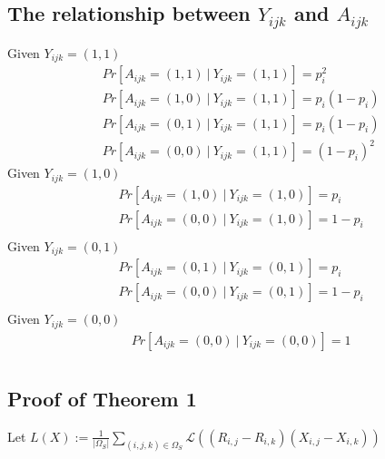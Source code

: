 \documentclass[conference]{IEEEtran}
\numberwithin{equation}{section}
\newtheorem{sampling strategy}{Sampling Strategy}
\begin{document}
\subsection{The relationship between $Y_{ijk}$ and $A_{ijk}$}
Given $Y_{ijk} = (1,1)$
\begin{equation}
\begin{aligned}
    & Pr[A_{ijk} = (1,1) ~|~ Y_{ijk} = (1,1)] = p_i^2 \\ 
    & Pr[A_{ijk} = (1,0) ~|~ Y_{ijk} = (1,1)] = p_i(1-p_i) \\
    & Pr[A_{ijk} = (0,1) ~|~ Y_{ijk} = (1,1)] = p_i(1-p_i) \\
    & Pr[A_{ijk} = (0,0) ~|~ Y_{ijk} = (1,1)] = (1-p_i)^2 \nonumber
\end{aligned}
\end{equation}
Given $Y_{ijk} = (1,0)$
\begin{equation}
\begin{aligned}
    & Pr[A_{ijk} = (1,0) ~|~ Y_{ijk} = (1,0)] = p_i \\ 
    & Pr[A_{ijk} = (0,0) ~|~ Y_{ijk} = (1,0)] = 1-p_i \\
 \nonumber
\end{aligned}
\end{equation}
Given $Y_{ijk} = (0,1)$
\begin{equation}
\begin{aligned}
    & Pr[A_{ijk} = (0,1) ~|~ Y_{ijk} = (0,1)] = p_i \\ 
    & Pr[A_{ijk} = (0,0) ~|~ Y_{ijk} = (0,1)] = 1-p_i \\
 \nonumber
\end{aligned}
\end{equation}
Given $Y_{ijk} = (0,0)$
\begin{equation}
\begin{aligned}
    & Pr[A_{ijk} = (0,0) ~|~ Y_{ijk} = (0,0)] = 1 \\ 
 \nonumber
\end{aligned}
\end{equation}

\subsection{Proof of Theorem 1}


Let $\displaystyle L(X) := \frac{1}{|\Omega_S|} \sum_{(i,j,k) \in \Omega_S}  \mathcal{L}( (R_{i,j} - R_{i,k})(X_{i,j} - X_{i,k}) )$
\end{document}
